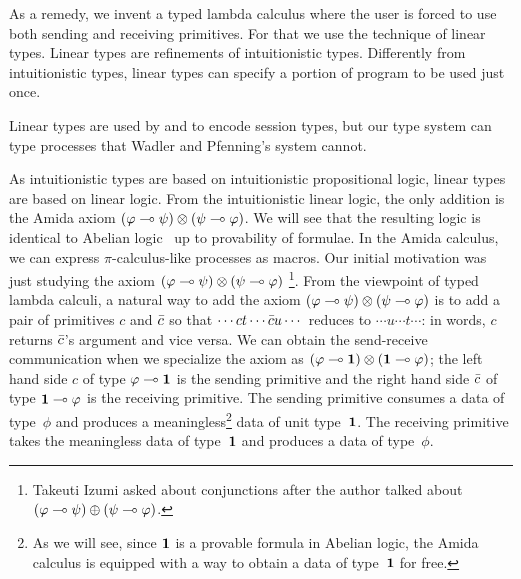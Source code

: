 As a remedy, we invent a typed lambda calculus where
the user is forced to use both sending and receiving primitives.
For that we use the technique of linear types.
Linear types are refinements of intuitionistic types.
Differently from intuitionistic types,
linear types can specify a portion of program to be used
just once.

Linear types are used by \citet{wadler2012propositions} and
\citet{pfenning2010} to encode session types, but our type system can
type processes that Wadler and Pfenning's system cannot.

As intuitionistic types are based on intuitionistic propositional logic,
linear types are based on linear logic.
From the intuitionistic linear logic,
the only addition is the Amida axiom
$(\varphi\multimap\psi)\otimes(\psi\multimap\varphi)$.
We will see that the resulting logic is identical to Abelian
logic~\citep{casari1989} up to provability of formulae.
In the Amida calculus, we can express $\pi$-calculus-like processes as macros.
Our initial motivation was just studying the axiom
$(\varphi\multimap\psi)\otimes(\psi\multimap\varphi)$%
\footnote{Takeuti Izumi asked about conjunctions
after the author talked about $(\varphi\multimap\psi)\oplus (\psi\multimap\varphi)$.}.
From the viewpoint of typed lambda calculi, a natural way to add
the axiom
$(\varphi\multimap\psi)\otimes(\psi\multimap\varphi)$
is to add a pair of primitives $c$ and $\bar{c}$ so that
$\cdots ct \cdots \bar{c} u \cdots$ reduces to
$\cdots u  \cdots t \cdots$: in words,
$c$ returns $\bar{c}$'s argument and vice versa.
We can obtain the send-receive communication when we specialize the
axiom as $(\varphi\multimap \mathbf{1})\otimes(\mathbf{1}\multimap\varphi)$; the left hand side
${c}$ of type ${\varphi\multimap\mathbf{1}}$ is the sending primitive and
the right hand side ${\bar{c}}$ of type ${\mathbf{1} \multimap\varphi}$ is the receiving
primitive.
The sending primitive consumes a data of type~$\phi$ and produces a
meaningless\footnote{As we will see, since $\mathbf{1}$ is a provable formula
in Abelian logic, the Amida calculus is equipped with a way to obtain a data
of type~$\mathbf{1}$ for free.} data of unit type~$\mathbf{1}$.
The receiving primitive takes the meaningless data of type~$\mathbf{1}$ and
produces a data of type~$\phi$.


